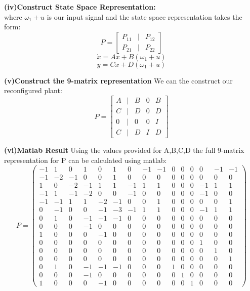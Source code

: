 \documentclass[10pt,a4paper]{article}
\begin{document}
\begin{tcolorbox}
\textbf{(iv)Construct State Space Representation:} \\
where $\omega_1+u$ is our input signal and the state space representation takes the form:
$$P=\begin{bmatrix}
P_{11}& |& P_{12}\\
\hline
P_{21}& |&P_{22}
\end{bmatrix}$$
$$\dot{x}=Ax+B(\omega_1 +u)$$
$$y=Cx+D(\omega_1 +u)$$

\textbf{(v)Construct the 9-matrix representation}
We can the construct our reconfigured plant:
$$P=\begin{bmatrix}
A& |& B& 0& B\\
\hline
C& |& D& 0& D\\
0& |& 0& 0& I\\
C& |& D& I& D
\end{bmatrix}
$$

\textbf{(vi)Matlab Result}
Using the values provided for A,B,C,D the full 9-matrix representation for P can be calculated using matlab:
$$P=\left(\begin{array}{ccccccccccccccc} 
-1 & 1 & 0 & 1 & 0 & 1 & 0 & -1 & -1 & 0 & 0 & 0 & 0 & -1 & -1\\ 
-1 & -2 & -1 & 0 & 0 & 1 & 0 & 0 & 0 & 0 & 0 & 0 & 0 & 0 & 0\\
 1 & 0 & -2 & -1 & 1 & 1 & -1 & 1 & 1 & 0 & 0 & 0 & -1 & 1 & 1\\ 
 -1 & 1 & -1 & -2 & 0 & 0 & -1 & 0 & 0 & 0 & 0 & 0 & -1 & 0 & 0\\
  -1 & -1 & 1 & 1 & -2 & -1 & 0 & 0 & 1 & 0 & 0 & 0 & 0 & 0 & 1\\
   0 & -1 & 0 & 0 & -1 & -3 & -1 & 1 & 1 & 0 & 0 & 0 & -1 & 1 & 1\\ 
   0 & 1 & 0 & -1 & -1 & -1 & 0 & 0 & 0 & 0 & 0 & 0 & 0 & 0 & 0\\ 
   0 & 0 & 0 & -1 & 0 & 0 & 0 & 0 & 0 & 0 & 0 & 0 & 0 & 0 & 0\\ 
   1 & 0 & 0 & 0 & -1 & 0 & 0 & 0 & 0 & 0 & 0 & 0 & 0 & 0 & 0\\ 
   0 & 0 & 0 & 0 & 0 & 0 & 0 & 0 & 0 & 0 & 0 & 0 & 1 & 0 & 0\\ 
   0 & 0 & 0 & 0 & 0 & 0 & 0 & 0 & 0 & 0 & 0 & 0 & 0 & 1 & 0\\ 
   0 & 0 & 0 & 0 & 0 & 0 & 0 & 0 & 0 & 0 & 0 & 0 & 0 & 0 & 1\\ 
   0 & 1 & 0 & -1 & -1 & -1 & 0 & 0 & 0 & 1 & 0 & 0 & 0 & 0 & 0\\ 
   0 & 0 & 0 & -1 & 0 & 0 & 0 & 0 & 0 & 0 & 1 & 0 & 0 & 0 & 0\\ 
   1 & 0 & 0 & 0 & -1 & 0 & 0 & 0 & 0 & 0 & 0 & 1 & 0 & 0 & 0 \end{array}\right)
$$

\end{tcolorbox}
\end{document}
